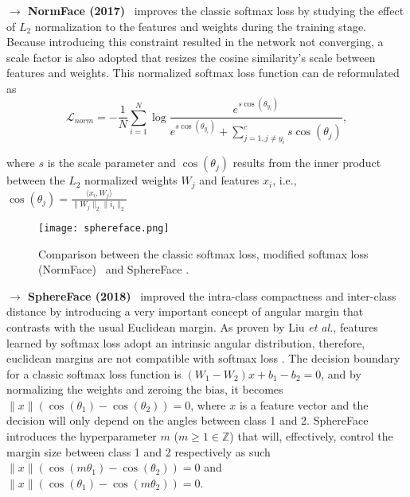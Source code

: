 \documentclass[class=report, crop=false, a4paper, 12pt]{standalone}
\begin{document}
\vspace{0.7\baselineskip}
\noindent\textbf{$\rightarrow$ NormFace (2017)}~\autocite{wangNormFaceL2Hypersphere2017} improves the classic softmax loss by studying the effect of $L_2$ normalization to the features and weights during the training stage. Because introducing this constraint resulted in the network not converging, a scale factor is also adopted that resizes the cosine similarity's scale between features and weights. This normalized softmax loss function can de reformulated as
\begin{equation}
\mathcal{L}_{norm} = -\frac{1}{N}\sum_{i=1}^{N}\log{\frac{e^{s \cos{(\theta_{y_i})}}}{e^{s \cos{(\theta_{y_i})}}+\sum_{j=1, j\neq y_i}^{c}s \cos{(\theta_{j})}}},
\end{equation}

\noindent where $s$ is the scale parameter and $\cos{(\theta_j)}$ results from the inner product between the $L_2$ normalized  weights $W_j$ and features $x_i$, i.e., $\cos{(\theta_j)}=\frac{\langle x_i, W_j\rangle}{\|W_j\|_2\|i_i\|_2}$

\begin{figure}[!h]
    \centering
    \texttt{[image: sphereface.png]}
    \caption{Comparison between the classic softmax loss, modified softmax loss (NormFace)~\autocite{wangNormFaceL2Hypersphere2017} and SphereFace \autocite{liuSphereFaceDeepHypersphere2018}.}
    \label{fig:sphereface}
\end{figure}

\vspace{0.7\baselineskip}
\noindent\textbf{$\rightarrow$ SphereFace (2018)}~\autocite{liuSphereFaceDeepHypersphere2018} improved the intra-class compactness and inter-class distance by introducing a very important concept of angular margin that contrasts with the usual Euclidean margin. As proven by Liu \textit{et al.}, features learned by softmax loss adopt an intrinsic angular distribution, therefore, euclidean margins are not compatible with softmax loss . The decision boundary for a classic softmax loss function is $(W_1 - W_2)x+b_1-b_2=0$, and by normalizing the weights and zeroing the bias, it becomes $\|x\|(\cos{(\theta_1)}-\cos{(\theta_2)})=0$, where $x$ is a feature vector and the decision will only depend on the angles between class 1 and 2. SphereFace introduces the hyperparameter $m$ ($m\geq1 \in \mathbb{Z}$) that will, effectively, control the margin size between class 1 and 2 respectively as such $\|x\|(\cos{(m\theta_1)}-\cos{(\theta_2)})=0$ and $\|x\|(\cos{(\theta_1)}-\cos{(m\theta_2)})=0$.
\end{document}
